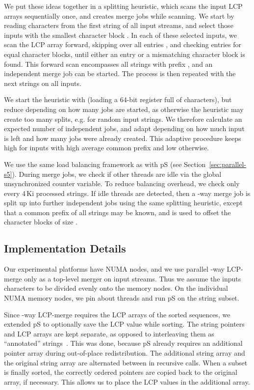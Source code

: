 \documentclass[a4paper]{myjournal}
\begin{document}
We put these ideas together in a splitting heuristic, which scans the  input
LCP arrays sequentially once, and creates merge jobs while scanning.  We start
by reading  characters from the first string of all  input streams, and
select those inputs with the smallest character block . In each of
these selected inputs, we scan the LCP array forward, skipping over all entries
, and checking entries  for equal character blocks, until either an
entry  or a mismatching character block is found. This forward scan
encompasses all strings with prefix , and an independent merge job
can be started.  The process is then repeated with the next strings on all 
inputs.

We start the heuristic with  (loading a 64-bit register full of
characters), but reduce  depending on how many jobs are started, as otherwise
the heuristic may create too many splits, e.g. for random input strings. We
therefore calculate an expected number of independent jobs, and adapt 
depending on how much input is left and how many jobs were already created. This
adaptive procedure keeps  high for inputs with high average common prefix and
low otherwise.

We use the same load balancing framework as with pS (see
Section~\ref{sec:parallel-s5}).  During merge jobs, we check if other threads
are idle via the global unsynchronized counter variable. To reduce balancing
overhead, we check only every 4\,Ki processed strings. If idle threads are
detected, then a -way merge job is split up into further independent jobs
using the same splitting heuristic, except that a common prefix of all strings
may be known, and is used to offset the character blocks of size .

\subsection{Implementation Details}\label{sec:merge-details}

Our experimental platforms have  NUMA nodes, and we use
parallel -way LCP-merge only as a top-level merger on  input
streams. Thus we assume the  inputs characters to be divided evenly onto the
 memory nodes.  On the individual NUMA memory nodes, we pin about
 threads and run pS on the string subset.

Since -way LCP-merge requires the LCP arrays of the sorted sequences, we
extended pS to optionally save the LCP value while sorting. The string
pointers and LCP arrays are kept separate, as opposed to interleaving them as
``annotated'' strings~\cite{ng2008merging}. This was done, because pS
already requires an additional pointer array during out-of-place
redistribution. The additional string array and the original string array are
alternated between in recursive calls. When a subset is finally sorted, the
correctly ordered pointers are copied back to the original array, if
necessary. This allows us to place the LCP values in the additional array.
\end{document}

